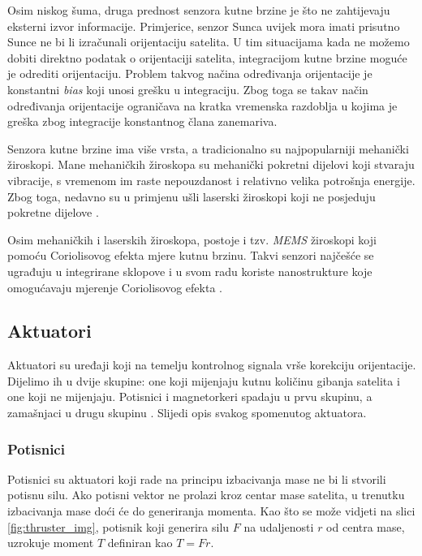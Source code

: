 \documentclass[times, utf8, diplomski, numeric]{templates/template}
\begin{document}
{{{            Osim niskog šuma, druga prednost senzora kutne brzine je što ne zahtijevaju eksterni izvor informacije. Primjerice, senzor Sunca uvijek mora imati prisutno Sunce ne bi li izračunali orijentaciju satelita. U tim situacijama kada ne možemo dobiti direktno podatak o orijentaciji satelita, integracijom kutne brzine moguće je odrediti orijentaciju. Problem takvog načina određivanja orijentacije je konstantni \emph{bias} koji unosi grešku u integraciju. Zbog toga se takav način određivanja orijentacije ograničava na kratka vremenska razdoblja u kojima je greška zbog integracije konstantnog člana zanemariva.

            Senzora kutne brzine ima više vrsta, a tradicionalno su najpopularniji mehanički žiroskopi. Mane mehaničkih žiroskopa su mehanički pokretni dijelovi koji stvaraju vibracije, s vremenom im raste nepouzdanost i relativno velika potrošnja energije. Zbog toga, nedavno su u primjenu ušli laserski žiroskopi koji ne posjeduju pokretne dijelove \cite{adcsKnjiga}. 

            Osim mehaničkih i laserskih žiroskopa, postoje i tzv. \emph{MEMS} žiroskopi koji pomoću Coriolisovog efekta mjere kutnu brzinu. Takvi senzori najčešće se ugrađuju u integrirane sklopove i u svom radu koriste nanostrukture koje omogućavaju mjerenje Coriolisovog efekta \cite{memsGyro}.
        }

        \subsection{Aktuatori}{
            Aktuatori su uređaji koji na temelju kontrolnog signala vrše korekciju orijentacije. Dijelimo ih u dvije skupine: one koji mijenjaju kutnu količinu gibanja satelita i one koji ne mijenjaju. Potisnici i magnetorkeri spadaju u prvu skupinu, a zamašnjaci u drugu skupinu \cite{adcsKnjiga}. Slijedi opis svakog spomenutog aktuatora. 

            \subsubsection{Potisnici }{
                Potisnici su aktuatori koji rade na principu izbacivanja mase ne bi li stvorili potisnu silu. Ako potisni vektor ne prolazi kroz centar mase satelita, u trenutku izbacivanja mase doći će do generiranja momenta. Kao što se može vidjeti na slici \ref{fig:thruster_img}, potisnik koji generira silu $F$ na udaljenosti $r$ od centra mase, uzrokuje moment $T$ definiran kao $T=Fr$.

}}}}
\end{document}
